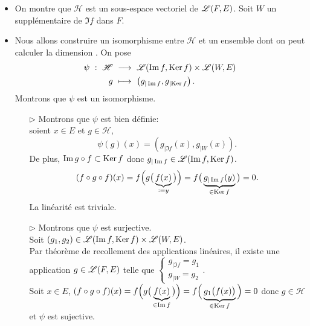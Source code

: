 \begin{solution}
    \begin{itemize}
        \item On montre que $\mathscr{H}$ est un sous-espace vectoriel de $\mathscr{L}(F, E)$. Soit $W$ un supplémentaire de $\Im f$ dans $F$.
        \item Nous allons construire un isomorphisme entre $\mathscr{H}$ et un ensemble dont on peut calculer la dimension \note. 
        \marginnote[0cm]{
            \begin{methode}
                \note
            \end{methode}
        }
        On pose
        \begin{alignat*}{2}
            \psi\ :\ \mathscr{H}\ &\longrightarrow\ \mathscr{L}(\Im f, \mathrm{Ker}\, f) \times \mathscr{L}(W, E)\\
            g\ &\longmapsto\ \left(g_{\vert \Im f}, g_{\vert \mathrm{Ker}\, f} \right).
        \end{alignat*}
        Montrons que $\psi$ est un isomorphisme. 
        \begin{itemize}
            \item[$\rhd$] Montrons que $\psi$ est bien définie: \\
            soient $x \in E$ et $g \in \mathscr{H}$,
            $$\psi(g)(x) = \left( g_{\vert \Im f}(x), g_{\vert W}(x) \right).$$
            De plus, $\Im g \circ f \subset \mathrm{Ker}\, f$ donc $g_{\vert \Im f} \in \mathscr{L}(\Im f, \mathrm{Ker}\, f)$.
            $$(f \circ g \circ f)(x) = f \Big( g \big (\underbrace{f(x)}_{\defeq y} \big ) \Big) = f \big( \underbrace{g_{\vert \Im f}(y)}_{\in \Ker f} \big) = 0.$$
            La linéarité est triviale. 
            \item[$\rhd$] Montrons que $\psi$ est surjective. \\
            Soit $(g_1, g_2) \in \mathscr{L}(\Im f, \mathrm{Ker}\, f) \times \mathscr{L}(W, E)$. \\
            Par théorème de recollement des applications linéaires, il existe une application $g \in \mathscr{L}(F, E)$ telle que 
            $
            \begin{cases}
                    g_{\vert \Im f} = g_1 \\
                    g_{\vert W} = g_2
            \end{cases}
            $. \\
            Soit $x \in E$, $(f \circ g \circ f)(x) = f \Big( g \big(\underbrace{f(x)}_{\in \Im f} \big) \Big) = f \Big( \underbrace{g_1 \big(f(x) \big)}_{\in \mathrm{Ker}\, f} \Big) = 0$ donc $g \in \mathscr{H}$ et $\psi$ est sujective. 

\end{itemize}
\end{itemize}
\end{solution}
